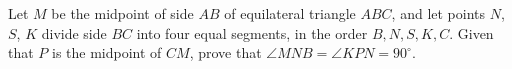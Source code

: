 Let $M$ be the midpoint of side $AB$ of equilateral triangle $ABC$, and let points $N$, $S$, $K$ divide side $BC$ into four equal segments, in the order $B,N,S,K,C$. Given that $P$ is the midpoint of $CM$, prove that $\angle MNB=\angle KPN=90^\circ$.
